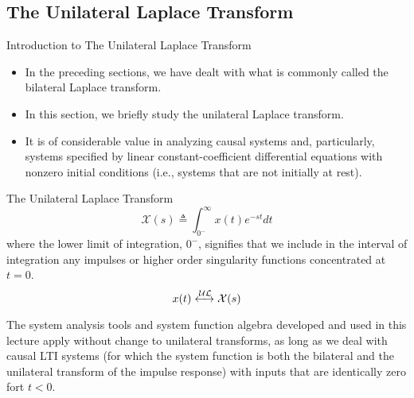 \subsection{The Unilateral Laplace Transform}

\begin{frame}{Introduction to The Unilateral Laplace Transform}
    \begin{itemize}
      \item In the preceding sections, we have dealt with what is commonly called the bilateral Laplace transform.
      \item In this section, we briefly study the unilateral Laplace transform.
      \item  It is of considerable value in analyzing causal systems and, particularly, systems specified by linear constant-coefficient differential equations with nonzero initial conditions (i.e., systems that are not initially at rest).
    \end{itemize}

\end{frame}


\begin{frame}{The Unilateral Laplace Transform}
    \begin{equation*}
        \mathcal{X}(s) \triangleq \int_{0^{-}}^{\infty}x(t)e^{-st}dt
    \end{equation*}
    where the lower limit of integration, $0^{-}$, signifies that we include in the interval of integration any impulses or higher order singularity functions concentrated at $t = 0$.
    \begin{equation*}
        x(t) \xleftrightarrow{\mathcal{UL}} \mathcal{X}(s)
    \end{equation*}

    \pause
    {
    }

    The system analysis tools and system function algebra developed and used in this lecture apply without change to unilateral transforms, \alert{as long
as we deal with causal LTI systems (for which the system function is both the bilateral and the unilateral transform of the impulse response) with inputs that are identically zero
fort $t< 0$}.
\end{frame}



